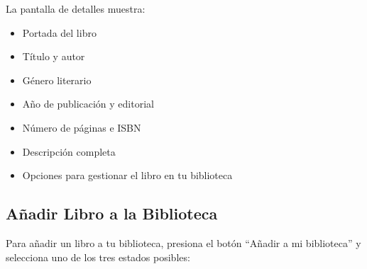 \documentclass[a4paper,12pt]{report}
\begin{document}
      La pantalla de detalles muestra:
      \begin{itemize}
        \item Portada del libro
        \item Título y autor
        \item Género literario
        \item Año de publicación y editorial
        \item Número de páginas e ISBN
        \item Descripción completa
        \item Opciones para gestionar el libro en tu biblioteca
      \end{itemize}
    
    \subsection{Añadir Libro a la Biblioteca}
    
      Para añadir un libro a tu biblioteca, presiona el botón ``Añadir a mi biblioteca'' y selecciona uno de los tres estados posibles:
      
\end{document}
